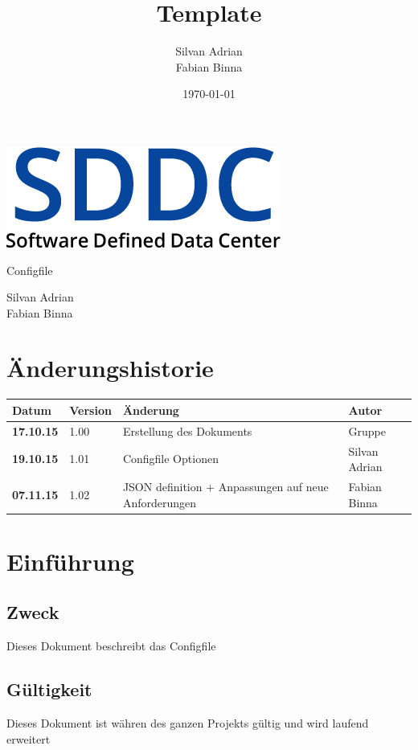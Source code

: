 \documentclass[11pt]{scrartcl}
\title{Template}
\author{Silvan Adrian \\ Fabian Binna}
\date{\today{}}
\begin{document}
\def\arraystretch{1.5}
\begin{titlepage}
\begin{center}
\vspace{10em}
\includegraphics[scale=2]{SDDC}
\vspace{10em}
\end{center}
\begin{center}
\huge {Configfile}
\end{center}
\begin{center}
\vspace{10em}
\LARGE {Silvan Adrian} \\
\LARGE {Fabian Binna}
\end{center}

\end{titlepage}

\newpage
\section{Änderungshistorie}
\begin{tabularx}{\linewidth}{l l X l}
\textbf{Datum} & \textbf{Version} & \textbf{Änderung}  & \textbf{Autor} \\
\hline
\textbf{17.10.15} & 1.00 & Erstellung des Dokuments & Gruppe \\
\textbf{19.10.15} & 1.01 & Configfile Optionen& Silvan Adrian \\
\textbf{07.11.15} & 1.02 & JSON definition + Anpassungen auf neue Anforderungen & Fabian Binna\\
\end{tabularx}

\newpage
\tableofcontents
\newpage
\section{Einführung}
\subsection{Zweck}
Dieses Dokument beschreibt das Configfile
\subsection{Gültigkeit}
Dieses Dokument ist währen des ganzen Projekts gültig und wird laufend erweitert
\end{document}
